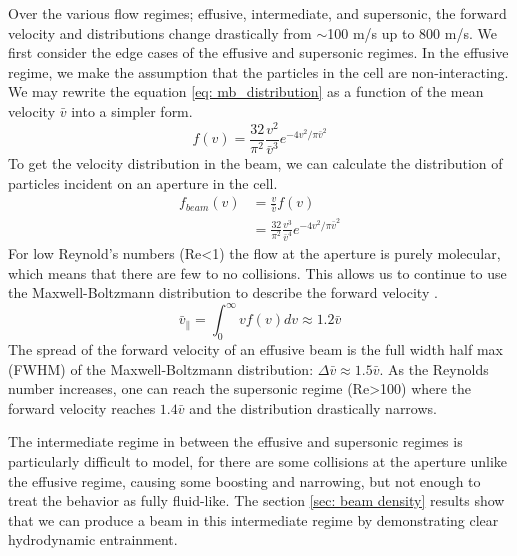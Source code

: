 Over the various flow regimes; effusive, intermediate, and supersonic, the forward velocity and distributions change drastically from $\sim$100 m/s up to 800 m/s. We first consider the edge cases of the effusive and supersonic regimes. In the effusive regime, we make the assumption that the particles in the cell are non-interacting. We may rewrite the equation \ref{eq: mb_distribution} as a function of the mean velocity $\bar{v}$ into a simpler form.
\begin{equation}
	f(v) = \frac{32}{\pi^2} \frac{v^2}{\bar{v}^3} e^{-4v^2/\pi \bar{v}^2} \label{eq: mb_simplified}
\end{equation}
To get the velocity distribution in the beam, we can calculate the distribution of particles incident on an aperture in the cell.
\begin{align*}
	f_{beam}(v) & = \frac{v}{\bar{v}}f(v)  \\
	& = \frac{32}{\pi^2} \frac{v^3}{\bar{v}^4} e^{-4v^2/\pi \bar{v}^2}
\end{align*}
For low Reynold's numbers (Re<1) the flow at the aperture is purely molecular, which means that there are few to no collisions. This allows us to continue to use the Maxwell-Boltzmann distribution to describe the forward velocity \cite{Hutzler2011c}.
\begin{equation}
	\bar{v}_\parallel = \int_0^\infty v f(v) dv \approx 1.2 \bar{v}
\end{equation}
The spread of the forward velocity of an effusive beam is the full width half max (FWHM) of the Maxwell-Boltzmann distribution: $\Delta\bar{v} \approx 1.5 \bar{v}$. As the Reynolds number increases, one can reach the supersonic regime (Re>100) where the forward velocity reaches $1.4\bar{v}$ and the distribution drastically narrows.\cite{Hutzler2011c,Pauly}

The intermediate regime in between the effusive and supersonic regimes is particularly difficult to model, for there are some collisions at the aperture unlike the effusive regime, causing some boosting and narrowing, but not enough to treat the behavior as fully fluid-like. The section \ref{sec: beam density} results show that we can produce a beam in this intermediate regime by demonstrating clear hydrodynamic entrainment.

